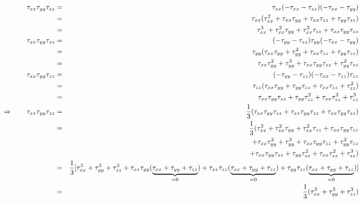 \begin{eqnarray}
\tau_{xx}\tau_{yy}\tau_{zz}
&=&\tau_{xx}(-\tau_{xx}-\tau_{zz})(-\tau_{xx}-\tau_{yy}) \nonumber\\
&=&\tau_{xx}(\tau_{xx}^2+\tau_{xx}\tau_{yy}+\tau_{xx}\tau_{zz}+\tau_{yy}\tau_{zz})\nonumber\\
&=&\tau_{xx}^3+\tau_{xx}^2\tau_{yy}+\tau_{xx}^2\tau_{zz}+\tau_{xx}\tau_{yy}\tau_{zz}\nonumber\\
\tau_{xx}\tau_{yy}\tau_{zz}
&=& (-\tau_{yy}-\tau_{zz})\tau_{yy}(-\tau_{xx}-\tau_{yy})\nonumber\\
&=& \tau_{yy}(\tau_{xx}\tau_{yy} + \tau_{yy}^2 + \tau_{xx}\tau_{zz} + \tau_{yy}\tau_{zz} )\nonumber\\
&=& \tau_{xx}\tau_{yy}^2 + \tau_{yy}^3 + \tau_{xx}\tau_{yy}\tau_{zz} + \tau_{yy}^2\tau_{zz} \nonumber\\
\tau_{xx}\tau_{yy}\tau_{zz}
&=& (-\tau_{yy}-\tau_{zz})(-\tau_{xx}-\tau_{zz}) \tau_{zz}\nonumber\\
&=& \tau_{zz}(\tau_{xx}\tau_{yy}+\tau_{yy}\tau_{zz}+\tau_{xx}\tau_{zz} + \tau_{zz}^2  ) \nonumber\\
&=& \tau_{xx}\tau_{yy}\tau_{zz}+\tau_{yy}\tau_{zz}^2+\tau_{xx}\tau_{zz}^2 + \tau_{zz}^3  \nonumber\\
\Rightarrow \qquad \tau_{xx}\tau_{yy}\tau_{zz} 
&=&\frac13
(\tau_{xx}\tau_{yy}\tau_{zz}+
\tau_{xx}\tau_{yy}\tau_{zz}+
\tau_{xx}\tau_{yy}\tau_{zz}
)\nonumber\\
&=&\frac13(\tau_{xx}^3+\tau_{xx}^2\tau_{yy}+\tau_{xx}^2\tau_{zz}+\tau_{xx}\tau_{yy}\tau_{zz} \nonumber\\
&&+ \tau_{xx}\tau_{yy}^2 + \tau_{yy}^3 + \tau_{xx}\tau_{yy}\tau_{zz} + \tau_{yy}^2\tau_{zz} \nonumber\\
&&+ \tau_{xx}\tau_{yy}\tau_{zz}+\tau_{yy}\tau_{zz}^2+\tau_{xx}\tau_{zz}^2 + \tau_{zz}^3 ) \nonumber\\
&=& \frac13 [\tau_{xx}^3+\tau_{yy}^3+\tau_{zz}^3 
+\tau_{xx}\tau_{yy}(\underbrace{ \tau_{xx}+\tau_{yy}+\tau_{zz}}_{=0}) 
+  \tau_{xx}\tau_{zz}(\underbrace{ \tau_{xx}+\tau_{yy}+\tau_{zz}}_{=0}) 
+  \tau_{yy}\tau_{zz}(\underbrace{ \tau_{xx}+\tau_{yy}+\tau_{zz}}_{=0}) ] \nonumber\\
&=& \frac13 (\tau_{xx}^3+\tau_{yy}^3+\tau_{zz}^3)  \nonumber
\end{eqnarray}



